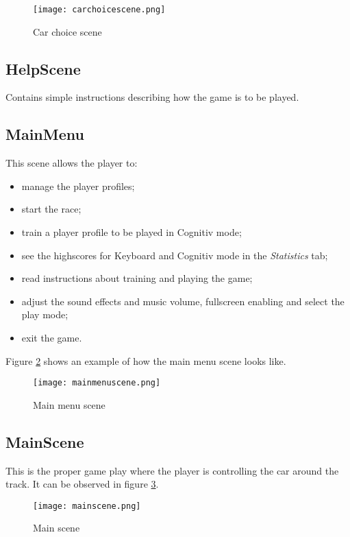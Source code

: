 \begin{figure}
  \centering
  \texttt{[image: carchoicescene.png]}
  \caption{Car choice scene}
    \label{fig:carchoicescene}           
\end{figure}

\subsection{HelpScene}
Contains simple instructions describing how the game is to be played. 

\subsection{MainMenu}
This scene allows the player to:
\begin{itemize}
	\item manage the player profiles;
	\item start the race;
	\item train a player profile to be played in Cognitiv mode;
	\item see the highscores for Keyboard and Cognitiv mode in the \textit{Statistics} tab;
	\item read instructions about training and playing the game;
	\item adjust the sound effects and music volume, fullscreen enabling and select the play mode;
	\item exit the game.
\end{itemize}

Figure \ref{fig:mainmenuscene} shows an example of how the main menu scene looks like.

\begin{figure}
  \centering
  \texttt{[image: mainmenuscene.png]}
  \caption{Main menu scene}
    \label{fig:mainmenuscene}           
\end{figure}

\subsection{MainScene}
This is the proper game play where the player is controlling the car around the track. It can be observed in figure \ref{fig:mainscene}.

\begin{figure}
  \centering
  \texttt{[image: mainscene.png]}
  \caption{Main scene}
    \label{fig:mainscene}           
\end{figure}

